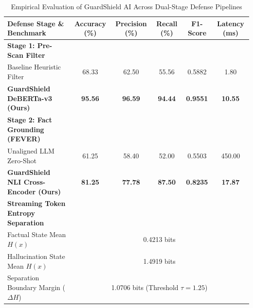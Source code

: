 
\begin{table}[t]
\centering
\small
\caption{Empirical Evaluation of GuardShield AI Across Dual-Stage Defense Pipelines}
\label{tab:guardshield_results}
\begin{tabular}{lccccc}
\toprule
\textbf{Defense Stage \& Benchmark} & \textbf{Accuracy (\%)} & \textbf{Precision (\%)} & \textbf{Recall (\%)} & \textbf{F1-Score} & \textbf{Latency (ms)} \\
\midrule
\textbf{Stage 1: Pre-Scan Filter} & & & & & \\
\quad Baseline Heuristic Filter & 68.33 & 62.50 & 55.56 & 0.5882 & 1.80 \\
\quad \textbf{GuardShield DeBERTa-v3 (Ours)} & \textbf{95.56} & \textbf{96.59} & \textbf{94.44} & \textbf{0.9551} & \textbf{10.55} \\
\midrule
\textbf{Stage 2: Fact Grounding (FEVER)} & & & & & \\
\quad Unaligned LLM Zero-Shot & 61.25 & 58.40 & 52.00 & 0.5503 & 450.00 \\
\quad \textbf{GuardShield NLI Cross-Encoder (Ours)} & \textbf{81.25} & \textbf{77.78} & \textbf{87.50} & \textbf{0.8235} & \textbf{17.87} \\
\midrule
\textbf{Streaming Token Entropy Separation} & & & & & \\
\quad Factual State Mean $H(x)$ & \multicolumn{5}{c}{0.4213 bits} \\
\quad Hallucination State Mean $H(x)$ & \multicolumn{5}{c}{1.4919 bits} \\
\quad Separation Boundary Margin ($\Delta H$) & \multicolumn{5}{c}{1.0706 bits (Threshold $\tau = 1.25$)} \\
\bottomrule
\end{tabular}
\end{table}

